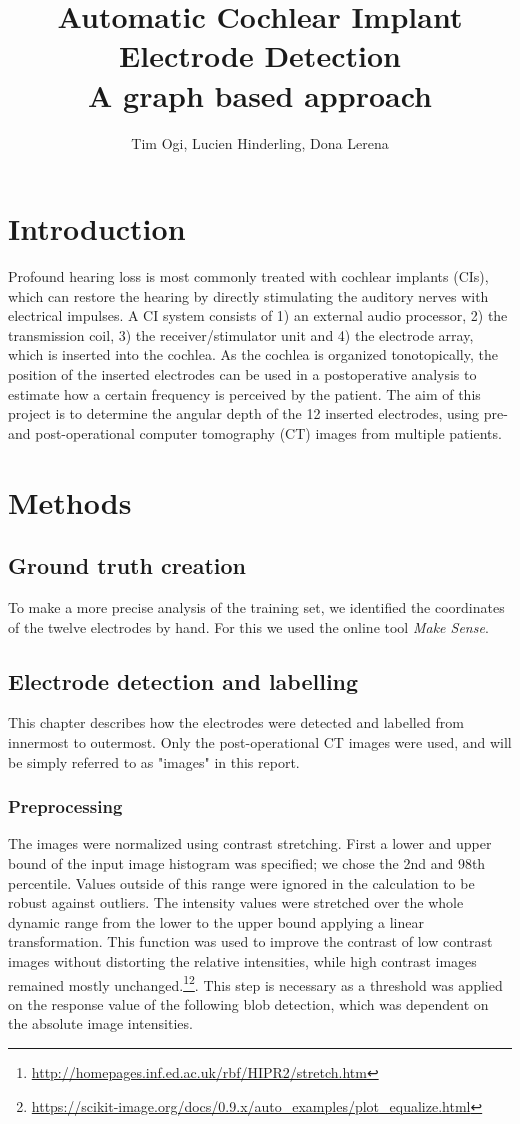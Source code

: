 \documentclass[a4paper, 10pt, twocolumn]{article}
\title{\textbf{Automatic Cochlear Implant Electrode Detection}\\ A graph based approach}
\author{Tim Ogi, Lucien Hinderling, Dona Lerena}
\begin{document}
\maketitle
\section{Introduction}
Profound hearing loss is most commonly treated with cochlear implants (CIs), which can restore the hearing by directly stimulating the auditory nerves with electrical impulses. A CI system consists of 1) an external audio processor, 2) the transmission coil, 3) the receiver/stimulator unit and 4) the electrode array, which is inserted into the cochlea. As the cochlea is organized tonotopically, the position of the inserted electrodes can be used in a postoperative analysis to estimate how a certain frequency is perceived by the patient. The aim of this project is to determine the angular depth of the 12 inserted electrodes, using pre- and post-operational computer tomography (CT) images from multiple patients.
\section{Methods}
\subsection{Ground truth creation}
To make a more precise analysis of the training set, we identified the coordinates of the twelve electrodes by hand. For this we used the online tool  \emph{Make Sense}\cite{makesense}. 
\subsection{Electrode detection and labelling}
This chapter describes how the electrodes were detected and labelled from innermost to outermost. Only the post-operational CT images were used, and will be simply referred to as "images" in this report.
\subsubsection{Preprocessing}
The images were normalized using contrast stretching. First a lower and upper bound of the input image histogram was specified; we chose the 2nd and 98th percentile. Values outside of this range were ignored in the calculation to be robust against outliers. The intensity values were stretched over the whole dynamic range from the lower to the upper bound applying a linear transformation. This function was used to improve the contrast of low contrast images without distorting the relative intensities, while high contrast images remained mostly unchanged.\footnote{\url{http://homepages.inf.ed.ac.uk/rbf/HIPR2/stretch.htm}}\footnote{\url{https://scikit-image.org/docs/0.9.x/auto_examples/plot_equalize.html}}. This step is necessary as a threshold was applied on the response value of the following blob detection, which was dependent on the absolute image intensities.
\end{document}
